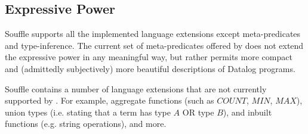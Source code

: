 \subsection{Expressive Power}
Souffle supports all the implemented language extensions except meta-predicates and type-inference\cite{SouffleHome}. The current set of meta-predicates offered by \datalogM does not extend the expressive power in any meaningful way, but rather permits more compact and (admittedly subjectively) more beautiful descriptions of Datalog programs. 

Souffle contains a number of language extensions that are not currently supported by \datalogM. For example, aggregate functions (such as $COUNT$, $MIN$, $MAX$), union types (i.e. stating that a term has type $A$ OR type $B$), and inbuilt functions (e.g. string operations), and more\cite{SouffleHome}.

